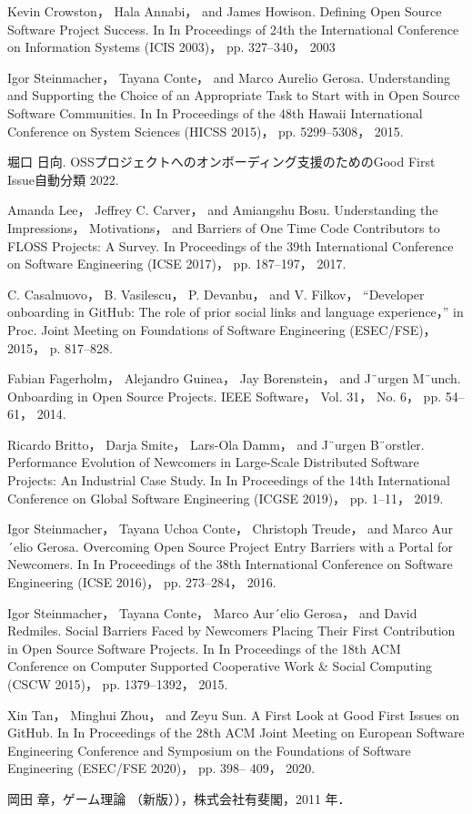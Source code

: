 \documentclass[11pt]{jreport}
\begin{document}
\begin{thebibliography}{99}

    Kevin Crowston， Hala Annabi， and James Howison. Defining Open Source Software Project
Success. In In Proceedings of 24th the International Conference on Information Systems
(ICIS 2003)， pp. 327–340， 2003

    Igor Steinmacher， Tayana Conte， and Marco Aurelio Gerosa. Understanding and Supporting
the Choice of an Appropriate Task to Start with in Open Source Software Communities.
In In Proceedings of the 48th Hawaii International Conference on System Sciences (HICSS
2015)， pp. 5299–5308， 2015.

    堀口 日向. OSSプロジェクトへのオンボーディング支援のためのGood First Issue自動分類 2022.

    Amanda Lee， Jeffrey C. Carver， and Amiangshu Bosu. Understanding the Impressions，
Motivations， and Barriers of One Time Code Contributors to FLOSS Projects: A Survey.
In Proceedings of the 39th International Conference on Software Engineering (ICSE 2017)，
pp. 187–197， 2017.

C. Casalnuovo， B. Vasilescu， P. Devanbu， and V. Filkov， “Developer
onboarding in GitHub: The role of prior social links and language experience，” in Proc. Joint Meeting on Foundations of Software Engineering
(ESEC/FSE)， 2015， p. 817–828.

Fabian Fagerholm， Alejandro Guinea， Jay Borenstein， and J¨urgen M¨unch. Onboarding in
Open Source Projects. IEEE Software， Vol. 31， No. 6， pp. 54–61， 2014.

 Ricardo Britto， Darja Smite， Lars-Ola Damm， and J¨urgen B¨orstler. Performance Evolution
of Newcomers in Large-Scale Distributed Software Projects: An Industrial Case Study. In In
Proceedings of the 14th International Conference on Global Software Engineering (ICGSE
2019)， pp. 1–11， 2019.

 Igor Steinmacher， Tayana Uchoa Conte， Christoph Treude， and Marco Aur´elio Gerosa.
Overcoming Open Source Project Entry Barriers with a Portal for Newcomers. In In
Proceedings of the 38th International Conference on Software Engineering (ICSE 2016)，
pp. 273–284， 2016.

Igor Steinmacher， Tayana Conte， Marco Aur´elio Gerosa， and David Redmiles. Social Barriers Faced by Newcomers Placing Their First Contribution in Open Source Software Projects.
In In Proceedings of the 18th ACM Conference on Computer Supported Cooperative Work & Social Computing (CSCW 2015)， pp. 1379–1392， 2015.

Xin Tan， Minghui Zhou， and Zeyu Sun. A First Look at Good First Issues on GitHub. In In
Proceedings of the 28th ACM Joint Meeting on European Software Engineering Conference
and Symposium on the Foundations of Software Engineering (ESEC/FSE 2020)， pp. 398–
409， 2020.

岡田 章，ゲーム理論 （新版）），株式会社有斐閣，2011 年． 

\end{thebibliography}
\end{document}
